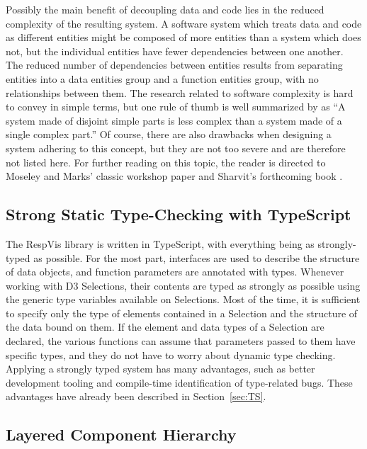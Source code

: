 Possibly the main benefit of decoupling data and code lies in the
reduced complexity of the resulting system. A software system which
treats data and code as different entities might be composed of more
entities than a system which does not, but the individual entities
have fewer dependencies between one another. The reduced number of
dependencies between entities results from separating entities into a
data entities group and a function entities group, with no
relationships between them. The research related to software
complexity is hard to convey in simple terms, but one rule of thumb is
well summarized by \textcite{DataCodeSeparation} as \enquote{A system
  made of disjoint simple parts is less complex than a system made of
  a single complex part.} Of course, there are also drawbacks when
designing a system adhering to this concept, but they are not too
severe and are therefore not listed here. For further reading on this
topic, the reader is directed to Moseley and Marks' classic workshop
paper \parencite{OutOfTarPit} and Sharvit's forthcoming book
\parencite{Sharvit-Book}.




\subsection{Strong Static Type-Checking with TypeScript}

The RespVis library is written in TypeScript, with everything being as
strongly-typed as possible. For the most part, interfaces are used to
describe the structure of data objects, and function parameters are
annotated with types. Whenever working with D3 Selections, their
contents are typed as strongly as possible using the generic type
variables available on Selections. Most of the time, it is sufficient
to specify only the type of elements contained in a Selection and the
structure of the data bound on them. If the element and data types of
a Selection are declared, the various functions can assume that
parameters passed to them have specific types, and they do not have to
worry about dynamic type checking. Applying a strongly typed system
has many advantages, such as better development tooling and
compile-time identification of type-related bugs. These advantages
have already been described in Section~\ref{sec:TS}.







\subsection{Layered Component Hierarchy}

